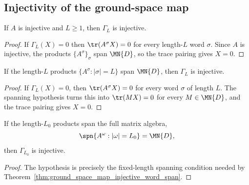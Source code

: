 \subsection{Injectivity of the ground-space map}

\begin{theorem}\label{thm:ground_space_map_injective}
    \leanok
    If $A$ is injective and $L \ge 1$, then $\Gamma_L$ is injective.
\end{theorem}

\begin{proof}
    \leanok
    If $\Gamma_L(X) = 0$ then $\tr(A^\sigma X) = 0$ for every length-$L$ word
    $\sigma$. Since $A$ is injective, the products $\{A^\sigma\}_\sigma$ span
    $\MN{D}$, so the trace pairing gives $X = 0$.
\end{proof}

\begin{theorem}
    \label{thm:ground_space_map_injective_word_span}
    \leanok
    If the length-$L$ products $\{A^\sigma : |\sigma| = L\}$ span $\MN{D}$, then
    $\Gamma_L$ is injective.
\end{theorem}

\begin{proof}
    \leanok
    If $\Gamma_L(X) = 0$, then $\tr(A^\sigma X) = 0$ for every word $\sigma$ of
    length $L$. The spanning hypothesis turns this into $\tr(MX) = 0$ for every
    $M \in \MN{D}$, and the trace pairing gives $X = 0$.
\end{proof}

\begin{lemma}
    \label{lem:ground_space_map_injective_blk}
    \leanok
    If the length-$L_0$ products span the full matrix algebra,
    \[
        \spn\{A^\omega:|\omega|=L_0\}=\MN{D},
    \]
    then $\Gamma_{L_0}$ is injective.
\end{lemma}

\begin{proof}
    \leanok
    The hypothesis is precisely the fixed-length spanning condition needed by
    Theorem~\ref{thm:ground_space_map_injective_word_span}.
\end{proof}

